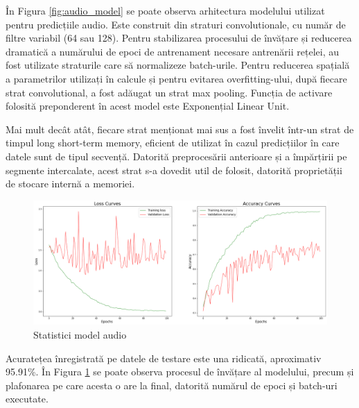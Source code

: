 \documentclass[a4paper, 12pt]{report}
\begin{document}
 	În Figura \ref{fig:audio_model} se poate observa arhitectura modelului utilizat pentru predicțiile audio. Este construit din straturi convolutionale, cu număr de filtre variabil (64 sau 128). Pentru stabilizarea procesului de învățare și reducerea dramatică a numărului de epoci de antrenament necesare antrenării rețelei, au fost utilizate straturile care să normalizeze batch-urile. Pentru reducerea spațială a parametrilor utilizați în calcule și pentru evitarea overfitting-ului, după fiecare strat convolutional, a fost adăugat un strat max pooling. Funcția de activare folosită preponderent în acest model este Exponențial Linear Unit. 
 	
 	Mai mult decât atât, fiecare strat menționat mai sus a fost învelit într-un strat de timpul long short-term memory, eficient de utilizat în cazul predicțiilor în care datele sunt de tipul secvență. Datorită preprocesării anterioare și a împărțirii pe segmente intercalate, acest strat s-a dovedit util de folosit, datorită proprietății de stocare internă a memoriei.
	
	\begin{figure}[H]
		\begin{center}
			\includegraphics[scale=0.2]{images/accuracy_audio_model.png}
		\end{center}
		\caption{Statistici model audio}
		\label{fig:audio_model_accuracy}
	\end{figure}
	
	Acuratețea înregistrată pe datele de testare este una ridicată, aproximativ 95.91\%. În Figura \ref{fig:audio_model_accuracy} se poate observa procesul de învățare al modelului, precum și plafonarea pe care acesta o are la final, datorită numărul de epoci și batch-uri executate.
	
\end{document}
